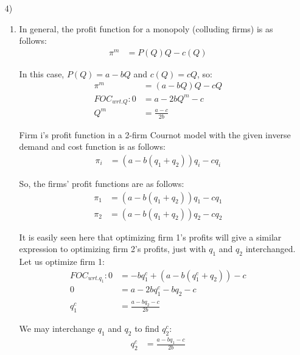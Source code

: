 \documentclass[12pt,letterpaper]{article}
\begin{document}
\begin{enumerate}
\item[4)]

\begin{enumerate}

    \item In general, the profit function for a monopoly (colluding firms) is as follows:
    \begin{align*}
        \pi^m &= P(Q)Q - c(Q)
    \end{align*}
    
    In this case, $P(Q) = a-bQ$ and $c(Q) = cQ$, so:
    \begin{align*}
        \pi^m &= (a-bQ)Q - cQ\\
        FOC_{wrt.Q}: 0 &= a-2bQ^m - c\\
        Q^m &= \frac{a-c}{2b}
    \end{align*}
    
    Firm i's profit function in a 2-firm Cournot model with the given inverse demand and cost function is as follows:
    \begin{align*}
        \pi_i &= (a - b(q_1 + q_2))q_i - cq_i
    \end{align*}
    
    So, the firms' profit functions are as follows:
    \begin{align*}
        \pi_1 &= (a - b(q_1 + q_2))q_1 - cq_1\\
        \pi_2 &= (a - b(q_1 + q_2))q_2 - cq_2
    \end{align*}
    
    It is easily seen here that optimizing firm 1's profits will give a similar expression to optimizing firm 2's profits, just with $q_1$ and $q_2$ interchanged. Let us optimize firm 1:
    \begin{align*}
        FOC_{wrt.q_1}: 0 &= -bq_1^c + (a-b(q_1^c + q_2)) - c\\
        0 &= a - 2bq_1^c - bq_2 - c\\
        q_1^c &= \frac{a - bq_2 - c}{2b}
    \end{align*}
    
    We may interchange $q_1$ and $q_2$ to find $q_2^c$:
    \begin{align*}
        q_2^c &= \frac{a - bq_1 - c}{2b}
    \end{align*}
    

\end{enumerate}
\end{enumerate}
\end{document}
